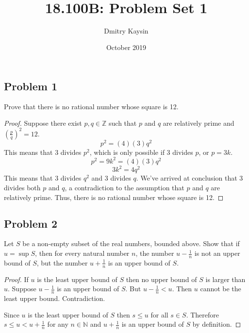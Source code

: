 \documentclass{article}
\title{18.100B: Problem Set 1}
\author{Dmitry Kaysin}
\date{October 2019}
\newcommand{\N}{\mathbb{N}}
\newcommand{\Z}{\mathbb{Z}}
\begin{document}
\maketitle 


\subsection*{Problem 1}

\begin{tcolorbox}
Prove that there is no rational number whose square is 12.
\end{tcolorbox}

\begin{proof}

Suppose there exist $p,q \in \Z$ such that $p$ and $q$ are relatively prime and $\left( \frac{p}{q} \right)^2 = 12$.
\[ p^2 = (4)(3)q^2 \]
This means that 3 divides $p^2$, which is only possible if 3 divides $p$, or $p = 3k$.
\[ p^2 = 9k^2 = (4)(3)q^2 \]
\[ 3k^2=4q^2 \]
This means that 3 divides $q^2$ and 3 divides $q$.
We've arrived at conclusion that 3 divides both $p$ and $q$, a contradiction to the assumption that $p$ and $q$ are relatively prime.
Thus, there is no rational number whose square is 12.

\end{proof}


\subsection*{Problem 2}
\begin{tcolorbox}
Let $S$ be a non-empty subset of the real numbers, bounded above.
Show that if $u = \sup S$, then for every natural number $n$, the number $u - \frac{1}{n}$ is not an upper bound of $S$, but the number $u + \frac{1}{n}$ is an upper bound of $S$.
\end{tcolorbox}

\begin{proof}

If $u$ is the least upper bound of $S$ then no upper bound of $S$ is larger than $u$. Suppose $u-\frac{1}{n}$ is an upper bound of $S$.
But $u-\frac{1}{n} < u$.
Then $u$ cannot be the least upper bound.
Contradiction.

Since $u$ is the least upper bound of $S$ then $s \leq u$ for all $s \in S$.
Therefore $s \leq u < u+\frac{1}{n}$ for any $n \in \N$ and $u+\frac{1}{n}$ is an upper bound of $S$ by definition.

\end{proof}
\end{document}
